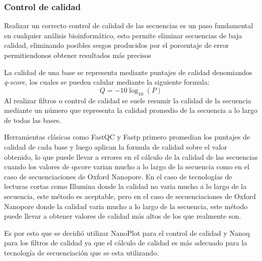 \subsubsection{Control de calidad}
Realizar un correcto control de calidad  de las secuencias es un paso fundamental en cualquier análisis bioinformático, esto permite eliminar secuencias de baja calidad, eliminando posibles sesgos producidos por el porcentaje de error permitiendonos obtener resultados más precisos


La calidad de una base se representa mediante puntajes de calidad denomiandos \textit{q-score}, los cuales se pueden calular mediante la siguiente formula:
\begin{equation}
    Q = -10 \log_{10}(P)
\end{equation}
Al realizar filtros o control de calidad se suele resumir la calidad de la secuencia mediante un número que representa la calidad promedio de la secuencia a lo largo de todas las bases. 

Herramientas clásicas como  FastQC y Fastp primero promedian los puntajes de calidad de cada base y luego aplican la formula de calidad sobre el valor obtenido, lo que puede llevar a errores en el cálculo de la calidad de las secuencias cuando los valores de qscore varian mucho a lo largo de la secuencia como en el caso de secuenciaciones de Oxford Nanopore.
En el caso de tecnologías de lecturas cortas como Illumina donde la calidad no varia mucho a lo largo de la secuencia, este método es aceptable, pero en el caso de secuenciaciones de Oxford Nanopore donde la calidad varia mucho a lo largo de la secuencia, este método puede llevar a obtener valores de calidad más altos de los que realmente son.

Es por esto que se decidió utilizar NanoPlot para el control de calidad y Nanoq para los filtros de calidad ya que el cálculo de calidad es más adecuado para la tecnología de secuenciación que se esta utilizando.%


